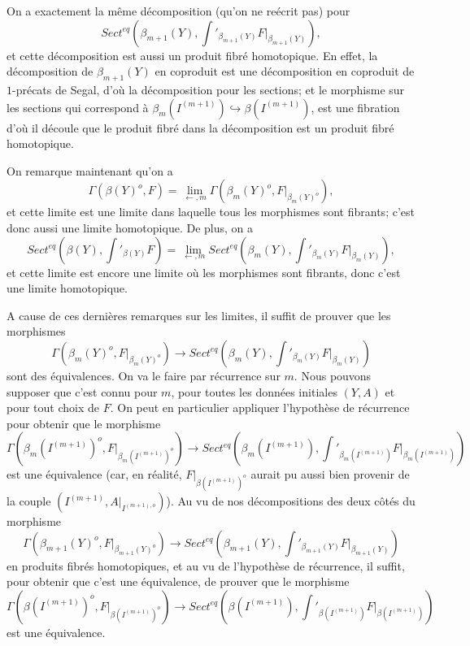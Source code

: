 \documentclass[12pt]{article}
\begin{document}
On a exactement la m\^eme d\'ecomposition (qu'on ne re\'ecrit pas) pour
$$
Sect ^{eq}(\beta
_{m+1}(Y), \int '_{\beta _{m+1}(Y)} F|_{\beta _{m+1}(Y)} ),
$$
et cette d\'ecomposition est aussi un
produit fibr\'e homotopique. En effet, la d\'ecomposition de
$\beta _{m+1}(Y)$ en coproduit est une d\'ecomposition en coproduit de
$1$-pr\'ecats de Segal, d'o\`u la d\'ecomposition pour les sections; et
le morphisme sur les sections qui correspond \`a $\beta
_m(I^{(m+1)})\hookrightarrow \beta (I^{(m+1)})$, est une fibration d'o\`u
il d\'ecoule que
le produit fibr\'e dans la d\'ecomposition est un produit fibr\'e homotopique.

On remarque maintenant qu'on a
$$
\Gamma (\beta (Y)^o, F)
= \lim _{\leftarrow , m}
\Gamma (\beta _m(Y)^o, F|_{\beta _m(Y)^o}),
$$
et cette limite est une limite dans laquelle tous les morphismes sont fibrants;
c'est donc aussi une limite homotopique. De plus, on a
$$
Sect ^{eq}(\beta (Y), \int '_{\beta (Y)} F)=
\lim _{\leftarrow , m}
Sect ^{eq}(\beta
_{m}(Y), \int '_{\beta _{m}(Y)} F|_{\beta _{m}(Y)} ),
$$
et cette limite est encore une limite o\`u les morphismes sont fibrants, donc
c'est une limite homotopique.

A cause de ces derni\`eres remarques sur les limites,
il suffit de prouver que les morphismes
$$
\Gamma (\beta _m(Y)^o, F|_{\beta _m(Y)^o})\rightarrow
Sect ^{eq}(\beta _m(Y), \int
'_{\beta _m(Y)}F |_{\beta _m(Y)})
$$
sont des \'equivalences. On va le faire par r\'ecurrence sur $m$.
Nous pouvons supposer que c'est connu pour $m$, pour toutes
les donn\'ees initiales $(Y,A)$ et
pour tout choix de $F$. On peut en particulier appliquer
l'hypoth\`ese de r\'ecurrence pour obtenir que le morphisme
$$
\Gamma (\beta _m(I^{(m+1)})^o, F|_{\beta _m(I^{(m+1)})^o})
\rightarrow Sect ^{eq}(\beta _m(I^{(m+1)}), \int
'_{\beta _m(I^{(m+1)})}F |_{\beta _m(I^{(m+1)})})
$$
est une \'equivalence
(car, en r\'ealit\'e, $F|_{\beta (I^{(m+1)})^o}$ aurait pu
aussi bien provenir de la couple
$(I^{(m+1)}, A|_{I^{(m+1), o}})$). Au vu de nos d\'ecompositions des deux
c\^ot\'es  du morphisme
$$
\Gamma (\beta _{m+1}(Y)^o, F|_{\beta _{m+1}(Y)^o})\rightarrow
Sect ^{eq}(\beta _{m+1}(Y),
\int '_{\beta _{m+1}(Y)}F |_{\beta _{m+1}(Y)})
$$
en produits fibr\'es homotopiques, et au vu de l'hypoth\`ese de r\'ecurrence, il
suffit, pour obtenir que c'est une \'equivalence, de prouver que le
morphisme
$$
\Gamma (\beta (I^{(m+1)})^o, F|_{\beta (I^{(m+1)})^o})\rightarrow
Sect ^{eq}(\beta (I^{(m+1)}),
\int '_{\beta (I^{(m+1)})}F |_{\beta (I^{(m+1)})})
$$
est une \'equivalence.
\end{document}
